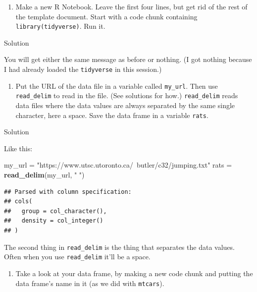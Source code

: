 \documentclass[]{tufte-book}
\newenvironment{Shaded}{}{}
\newcommand{\KeywordTok}[1]{\textcolor[rgb]{0.00,0.44,0.13}{\textbf{#1}}}
\newcommand{\NormalTok}[1]{#1}
\newcommand{\StringTok}[1]{\textcolor[rgb]{0.25,0.44,0.63}{#1}}
\providecommand{\tightlist}{%
  \setlength{\itemsep}{0pt}\setlength{\parskip}{0pt}}
\theoremstyle{definition}
\theoremstyle{definition}
\theoremstyle{definition}
\theoremstyle{remark}
\begin{document}
\begin{enumerate}
\def\labelenumi{(\alph{enumi})}
\setcounter{enumi}{1}
\tightlist
\item
  Make a new R Notebook. Leave the first four lines, but get rid of the
  rest of the template document. Start with a code chunk containing
  \texttt{library(tidyverse)}. Run it.
\end{enumerate}

Solution

You will get either the same message as before or nothing. (I got
nothing because I had already loaded the \texttt{tidyverse} in this
session.)

\begin{enumerate}
\def\labelenumi{(\alph{enumi})}
\setcounter{enumi}{2}
\tightlist
\item
  Put the URL of the data file in a variable called \texttt{my\_url}.
  Then use \texttt{read\_delim} to read in the file. (See solutions for
  how.) \texttt{read\_delim} reads data files where the data values are
  always separated by the same single character, here a space. Save the
  data frame in a variable \texttt{rats}.
\end{enumerate}

Solution

Like this:

\begin{Shaded}
\begin{Highlighting}[]
\NormalTok{my_url =}\StringTok{ "https://www.utsc.utoronto.ca/~butler/c32/jumping.txt"}
\NormalTok{rats =}\StringTok{ }\KeywordTok{read_delim}\NormalTok{(my_url, }\StringTok{" "}\NormalTok{)}
\end{Highlighting}
\end{Shaded}

\begin{verbatim}
## Parsed with column specification:
## cols(
##   group = col_character(),
##   density = col_integer()
## )
\end{verbatim}

The second thing in \texttt{read\_delim} is the thing that separates the
data values. Often when you use \texttt{read\_delim} it'll be a space.

\begin{enumerate}
\def\labelenumi{(\alph{enumi})}
\setcounter{enumi}{3}
\tightlist
\item
  Take a look at your data frame, by making a new code chunk and putting
  the data frame's name in it (as we did with \texttt{mtcars}).
\end{enumerate}
\end{document}
